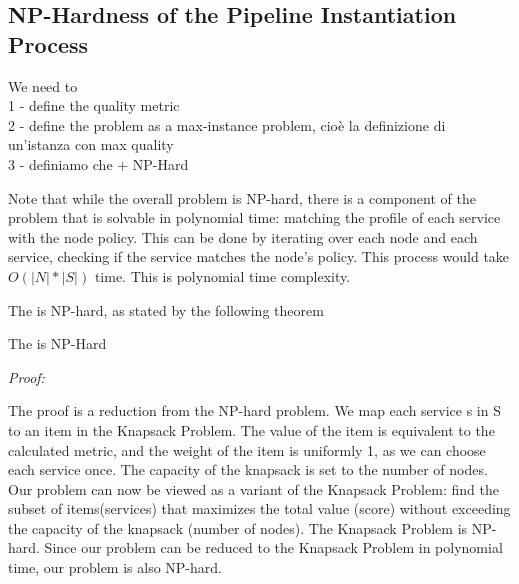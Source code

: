 \subsection{NP-Hardness of the Pipeline Instantiation Process}
We need to\\
1 - define the quality metric\\
2 - define the problem as a max-instance problem, cioè la definizione di un'istanza con max quality\\
3 - definiamo che + NP-Hard

\begin{problem}

\end{problem}

Note that while the overall problem is NP-hard, there is a component of the problem that is solvable in polynomial time: matching the profile of each service with the node policy.
This can be done by iterating over each node and each service, checking if the service matches the node’s policy.
This process would take $O(|N|*|S|)$ time. This is polynomial time complexity.

The \problem is NP-hard, as stated by the following theorem
\begin{theorem}
  The \problem is NP-Hard
\end{theorem}
\emph{Proof: }

The proof is a reduction from the NP-hard problem. We map each service s in S to an item in the Knapsack Problem.
The value of the item is equivalent to the calculated metric, and the weight of the item is uniformly 1, as we can choose each service once. The capacity of the knapsack is set to the number of nodes.
Our problem can now be viewed as a variant of the Knapsack Problem: find the subset of items(services)
that maximizes the total value (score) without exceeding the capacity of the knapsack (number of nodes).
The Knapsack Problem is NP-hard.
Since our problem can be reduced to the Knapsack Problem in polynomial time, our problem is also NP-hard.


